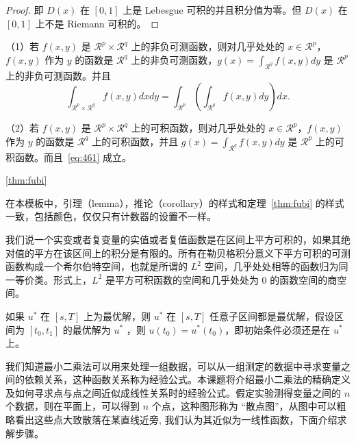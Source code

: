 \documentclass[lang=cn,10pt]{elegantbook}
\begin{document}
\begin{proof}
即 $D(x)$ 在 $[0,1]$ 上是 Lebesgue 可积的并且积分值为零。但 $D(x)$ 在 $[0,1]$ 上不是 Riemann 可积的。
\end{proof}

\begin{theorem}[Fubini 定理] \label{thm:fubi} 
（1）若 $f(x,y)$ 是 $\mathcal{R}^p\times\mathcal{R}^q$ 上的非负可测函数，则对几乎处处的 $x\in \mathcal{R}^p$，$f(x,y)$ 作为 $y$ 的函数是 $\mathcal{R}^q$ 上的非负可测函数，$g(x)=\int_{\mathcal{R}^q}f(x,y) dy$ 是 $\mathcal{R}^p$ 上的非负可测函数。并且
\begin{equation}
   \label{eq:461}
   \int_{\mathcal{R}^p\times\mathcal{R}^q} f(x,y) dxdy=\int_{\mathcal{R}^p}\left(\int_{\mathcal{R}^q}f(x,y)dy\right)dx.
\end{equation}

（2）若 $f(x,y)$ 是 $\mathcal{R}^p\times\mathcal{R}^q$ 上的可积函数，则对几乎处处的 $x\in\mathcal{R}^p$，$f(x,y)$ 作为 $y$ 的函数是 $\mathcal{R}^q$ 上的可积函数，并且 $g(x)=\int_{\mathcal{R}^q}f(x,y) dy$ 是 $\mathcal{R}^p$ 上的可积函数。而且~\ref{eq:461} 成立。
\end{theorem}

\ref{thm:fubi}

\begin{note}
在本模板中，引理（lemma），推论（corollary）的样式和定理~\ref{thm:fubi} 的样式一致，包括颜色，仅仅只有计数器的设置不一样。
\end{note}

我们说一个实变或者复变量的实值或者复值函数是在区间上平方可积的，如果其绝对值的平方在该区间上的积分是有限的。所有在勒贝格积分意义下平方可积的可测函数构成一个希尔伯特空间，也就是所谓的 $L^2$ 空间，几乎处处相等的函数归为同一等价类。形式上，$L^2$ 是平方可积函数的空间和几乎处处为 0 的函数空间的商空间。

\begin{proposition}[最优性原理] \label{pro:max}
如果 $u^*$ 在 $[s,T]$ 上为最优解，则 $u^*$ 在 $[s, T]$ 任意子区间都是最优解，假设区间为 $[t_0, t_1]$ 的最优解为 $u^*$ ，则 $u(t_0)=u^{*}(t_0)$，即初始条件必须还是在 $u^*$ 上。
\end{proposition}

我们知道最小二乘法可以用来处理一组数据，可以从一组测定的数据中寻求变量之间的依赖关系，这种函数关系称为经验公式。本课题将介绍最小二乘法的精确定义及如何寻求点与点之间近似成线性关系时的经验公式。假定实验测得变量之间的 $n$ 个数据，则在平面上，可以得到 $n$ 个点，这种图形称为 “散点图”，从图中可以粗略看出这些点大致散落在某直线近旁, 我们认为其近似为一线性函数，下面介绍求解步骤。
\end{document}
